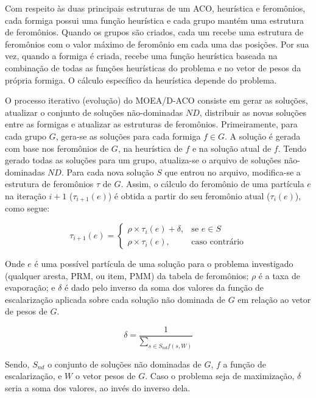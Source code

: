 Com respeito às duas principais estruturas de um ACO, heurística e feromônios, cada formiga possui uma função heurística e cada grupo mantém uma estrutura de feromônios. Quando os grupos são criados, cada um recebe uma estrutura de feromônios com o valor máximo de feromônio em cada uma das posições. Por sua vez, quando a formiga é criada, recebe uma função heurística baseada na combinação de todas as funções heurísticas do problema e no vetor de pesos da própria formiga. O cálculo específico da heurística depende do problema.

O processo iterativo (evolução) do MOEA/D-ACO consiste em gerar as soluções, atualizar o conjunto de soluções não-dominadas $ND$, distribuir as novas soluções entre as formigas e atualizar as estruturas de feromônios. Primeiramente, para cada grupo $G$, gera-se as soluções para cada formiga $f \in G$. A solução é gerada com base nos feromônios de $G$, na heurística de $f$ e na solução atual de $f$. Tendo gerado todas as soluções para um grupo, atualiza-se o arquivo de soluções não-dominadas $ND$. Para cada nova solução $S$ que entrou no arquivo, modifica-se a estrutura de feromônios $\tau$ de $G$. Assim, o cálculo do feromônio de uma partícula $e$ na iteração $i+1$ ($\tau_{i+1}(e)$) é obtida a partir do seu feromônio atual ($\tau_i(e)$), como segue:

\[
\tau_{i+1}(e)= 
\begin{cases}
\rho \times \tau_i(e) + \delta,& \text{se } e \in S\\
\rho \times \tau_i(e),              & \text{caso contrário}
\end{cases}
\]

\vspace{4mm} %

Onde $e$ é uma possível partícula de uma solução para o problema investigado (qualquer aresta, PRM, ou item, PMM) da tabela de feromônios; $\rho$ é a taxa de evaporação; e $\delta$ é dado pelo inverso da soma dos valores da função de escalarização aplicada sobre cada solução não dominada de $G$ em relação ao vetor de pesos de $G$.

\[\delta = \frac{1}{\sum_{s \in S_{nd}f(s, W)}}\]
	
Sendo, $S_{nd}$ o conjunto de soluções não dominadas de $G$, $f$ a função de escalarização, e $W$ o vetor pesos de $G$. Caso o problema seja de maximização, $\delta$ seria a soma dos valores, ao invés do inverso dela. 

